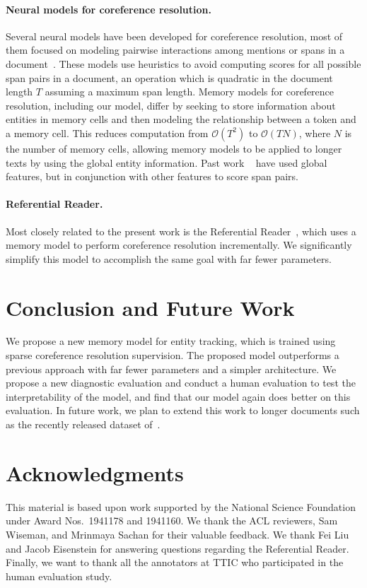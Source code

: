 \documentclass[11pt,a4paper]{article}
\begin{document}
\paragraph{Neural models for coreference resolution.}
Several neural models have been developed for coreference resolution, most of them focused on modeling pairwise interactions among mentions or spans in a document~\citep{wiseman-etal-2015-learning,clark-manning-2016-deep,lee-etal-2017-end,lee-etal-2018-higher}. These models use heuristics to avoid computing scores for all possible span pairs in a document, an operation which is quadratic in the document length $T$ assuming a maximum span length.
Memory models for coreference resolution, including our model, differ by seeking to store information about entities in memory cells and then modeling the relationship between a token and a memory cell. This reduces computation from $\mathcal{O}(T^2)$ to $\mathcal{O}(TN)$, where $N$ is the number of memory cells, allowing memory models to be applied to longer texts by using the global entity information. Past work ~\citep{wiseman-etal-2016-learning} have used global features, but in conjunction with other features to score span pairs.


\paragraph{Referential Reader.} Most closely related to the present work is the Referential Reader~\citep{liu2019referential}, which uses a memory model to perform coreference resolution incrementally. We significantly simplify this model to accomplish the same goal with far fewer parameters.
 \section{Conclusion and Future Work}
We propose a new memory model for entity tracking, which is trained using sparse coreference resolution supervision.
The proposed model outperforms a previous approach with far fewer parameters and a simpler architecture.
We propose a new diagnostic evaluation and conduct a human evaluation to test the interpretability of the model, and find that
our model again does better on this evaluation.
In future work, we plan to extend this work to longer documents such as the recently released dataset of~\citet{bamman2019annotated}.
 
\section*{Acknowledgments}
{\footnotesize
This material is based upon work supported by the National Science Foundation under Award Nos.~1941178 and 1941160.
We thank the ACL reviewers, Sam Wiseman, and Mrinmaya Sachan for their valuable feedback.
We thank Fei Liu and Jacob Eisenstein for answering questions regarding the Referential Reader.
Finally, we want to thank all the annotators at TTIC who participated in the human evaluation study.}
\end{document}
